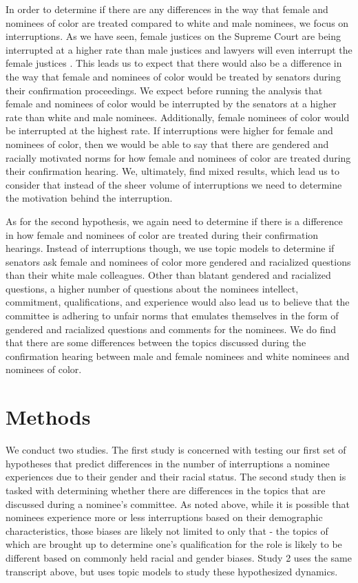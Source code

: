 \documentclass [12pt]{article}
\begin{document}
In order to determine if there are any differences in the way that female and nominees of color are treated compared to white and male nominees, we focus on interruptions. As we have seen, female justices on the Supreme Court are being interrupted at a higher rate than male justices and lawyers will even interrupt the female justices \citep{Jacobi2017}. This leads us to expect that there would also be a difference in the way that female and nominees of color would be treated by senators during their confirmation proceedings. We expect before running the analysis that female and nominees of color would be interrupted by the senators at a higher rate than white and male nominees. Additionally, female nominees of color would be interrupted at the highest rate. If interruptions were higher for female and nominees of color, then we would be able to say that there are gendered and racially motivated norms for how female and nominees of color are treated during their confirmation hearing. We, ultimately, find mixed results, which lead us to consider that instead of the sheer volume of interruptions we need to determine the motivation behind the interruption.

As for the second hypothesis, we again need to determine if there is a difference in how female and nominees of color are treated during their confirmation hearings. Instead of interruptions though, we use topic models to determine if senators ask female and nominees of color more gendered and racialized questions than their white male colleagues. Other than blatant gendered and racialized questions, a higher number of questions about the nominees intellect, commitment, qualifications, and experience would also lead us to believe that the committee is adhering to unfair norms that emulates themselves in the form of gendered and racialized questions and comments for the nominees. We do find that there are some differences between the topics discussed during the confirmation hearing between male and female nominees and white nominees and nominees of color.

\section{Methods}

We conduct two studies. The first study is concerned with testing our first set of hypotheses that predict differences in the number of interruptions a nominee experiences due to their gender and their racial status. The second study then is tasked with determining whether there are differences in the topics that are discussed during a nominee's committee. As noted above, while it is possible that nominees experience more or less interruptions based on their demographic characteristics, those biases are likely not limited to only that - the topics of which are brought up to determine one's qualification for the role is likely to be different based on commonly held racial and gender biases. Study 2 uses the same transcript above, but uses topic models to study these hypothesized dynamics.
	     
\end{document}

